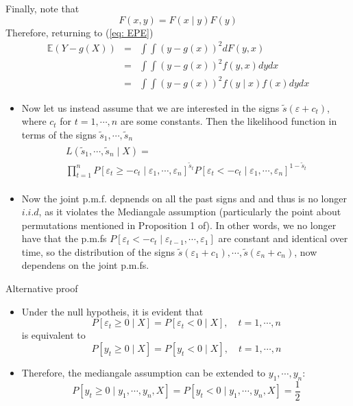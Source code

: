 \documentclass{beamer}
\newcommand{\E}{\mathbb{E}}
\begin{document}
\begin{frame}
Finally, note that 
\[
F(x,y)=F(x\mid y)F(y)
\]
Therefore, returning to (\ref{eq: EPE})
\begin{eqnarray*}
\E(Y-g(X))&=&\int\int(y-g(x))^2dF(y,x)\\
&=&\int\int(y-g(x))^2f(y,x)dydx\\
&=&\int\int(y-g(x))^2f(y\mid x)f(x)dydx
\end{eqnarray*}
\end{frame}

\begin{frame}
\begin{itemize}
\item{} Now let us instead assume that we are interested in the signs $\tilde{s}(\varepsilon+c_t)$, where $c_t$ for $t=1,\cdots,n$ are some constants. Then the likelihood function in terms of the signs $\tilde{s}_1,\cdots,\tilde{s}_n$ 
\begin{align*}
\begin{array}{l}
L(\tilde{s}_1,\cdots,\tilde{s}_n\mid X)=\\
\prod\limits_{t=1}^{n}P[\varepsilon_t\geq -c_t\mid \varepsilon_1,\cdots,\varepsilon_n]^{\tilde{s}_t}P[\varepsilon_t< -c_t \mid \varepsilon_1,\cdots,\varepsilon_n]^{1-\tilde{s}_t}	
\end{array}
\end{align*}
\item{} Now the joint p.m.f. depnends on all the past signs and and thus is no longer $i.i.d$, as it violates the Mediangale assumption (particularly the point about permutations mentioned in Proposition 1 of). In other words, we no longer have that the p.m.fs $P[\varepsilon_t<-c_t\mid \varepsilon_{t-1},\cdots,\varepsilon_{1}]$ are constant and identical over time, so the distribution of the signs $\tilde{s}(\varepsilon_1+c_1),\cdots,\tilde{s}(\varepsilon_n+c_n)$, now dependens on the joint p.m.fs.
\end{itemize}
\end{frame}

\begin{frame}{Alternative proof}
\begin{itemize}
\item{}Under the null hypotheis, it is evident that
\[
P[\varepsilon_t\geq0\mid X]=P[\varepsilon_t<0\mid X],\quad t=1,\cdots,n
\]
is equivalent to
\[
P[y_t\geq0\mid X]=P[y_t<0\mid X],\quad t=1,\cdots,n
\]
\item{}Therefore, the mediangale assumption can be extended to $y_1,\cdots,y_n$:
\[
P[y_t\geq0\mid y_1,\cdots,y_n,X]=P[y_t<0\mid y_1,\cdots,y_n,X]=\frac{1}{2}
\]
\end{itemize}
\end{frame}
\end{document}
